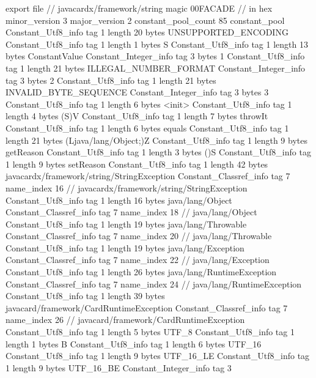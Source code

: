 export file {		// javacardx/framework/string
	magic	00FACADE		 // in hex
	minor_version	3
	major_version	2
	constant_pool_count	85
	constant_pool {
		Constant_Utf8_info {
			tag	1
			length	20
			bytes	UNSUPPORTED_ENCODING
		}
		Constant_Utf8_info {
			tag	1
			length	1
			bytes	S
		}
		Constant_Utf8_info {
			tag	1
			length	13
			bytes	ConstantValue
		}
		Constant_Integer_info {
			tag	3
			bytes	1
		}
		Constant_Utf8_info {
			tag	1
			length	21
			bytes	ILLEGAL_NUMBER_FORMAT
		}
		Constant_Integer_info {
			tag	3
			bytes	2
		}
		Constant_Utf8_info {
			tag	1
			length	21
			bytes	INVALID_BYTE_SEQUENCE
		}
		Constant_Integer_info {
			tag	3
			bytes	3
		}
		Constant_Utf8_info {
			tag	1
			length	6
			bytes	<init>
		}
		Constant_Utf8_info {
			tag	1
			length	4
			bytes	(S)V
		}
		Constant_Utf8_info {
			tag	1
			length	7
			bytes	throwIt
		}
		Constant_Utf8_info {
			tag	1
			length	6
			bytes	equals
		}
		Constant_Utf8_info {
			tag	1
			length	21
			bytes	(Ljava/lang/Object;)Z
		}
		Constant_Utf8_info {
			tag	1
			length	9
			bytes	getReason
		}
		Constant_Utf8_info {
			tag	1
			length	3
			bytes	()S
		}
		Constant_Utf8_info {
			tag	1
			length	9
			bytes	setReason
		}
		Constant_Utf8_info {
			tag	1
			length	42
			bytes	javacardx/framework/string/StringException
		}
		Constant_Classref_info {
			tag	7
			name_index	16		// javacardx/framework/string/StringException
		}
		Constant_Utf8_info {
			tag	1
			length	16
			bytes	java/lang/Object
		}
		Constant_Classref_info {
			tag	7
			name_index	18		// java/lang/Object
		}
		Constant_Utf8_info {
			tag	1
			length	19
			bytes	java/lang/Throwable
		}
		Constant_Classref_info {
			tag	7
			name_index	20		// java/lang/Throwable
		}
		Constant_Utf8_info {
			tag	1
			length	19
			bytes	java/lang/Exception
		}
		Constant_Classref_info {
			tag	7
			name_index	22		// java/lang/Exception
		}
		Constant_Utf8_info {
			tag	1
			length	26
			bytes	java/lang/RuntimeException
		}
		Constant_Classref_info {
			tag	7
			name_index	24		// java/lang/RuntimeException
		}
		Constant_Utf8_info {
			tag	1
			length	39
			bytes	javacard/framework/CardRuntimeException
		}
		Constant_Classref_info {
			tag	7
			name_index	26		// javacard/framework/CardRuntimeException
		}
		Constant_Utf8_info {
			tag	1
			length	5
			bytes	UTF_8
		}
		Constant_Utf8_info {
			tag	1
			length	1
			bytes	B
		}
		Constant_Utf8_info {
			tag	1
			length	6
			bytes	UTF_16
		}
		Constant_Utf8_info {
			tag	1
			length	9
			bytes	UTF_16_LE
		}
		Constant_Utf8_info {
			tag	1
			length	9
			bytes	UTF_16_BE
		}
		Constant_Integer_info {
			tag	3
}}}
